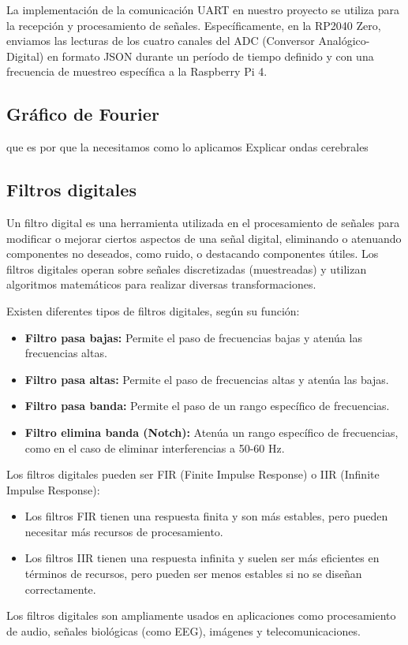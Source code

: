 \documentclass{article}
\begin{document}
La implementación de la comunicación UART en nuestro proyecto se utiliza para la recepción y procesamiento de señales. Específicamente, en la RP2040 Zero, enviamos las lecturas de los cuatro canales del ADC (Conversor Analógico-Digital) en formato JSON durante un período de tiempo definido y con una frecuencia de muestreo específica a la Raspberry Pi 4.

\subsection{Gráfico de Fourier}
que es
por que la necesitamos
como lo aplicamos
Explicar ondas cerebrales

\subsection{Filtros digitales}

Un filtro digital es una herramienta utilizada en el procesamiento de señales para modificar o mejorar ciertos aspectos de una señal digital, eliminando o atenuando componentes no deseados, como ruido, o destacando componentes útiles. Los filtros digitales operan sobre señales discretizadas (muestreadas) y utilizan algoritmos matemáticos para realizar diversas transformaciones.

Existen diferentes tipos de filtros digitales, según su función:
\begin{itemize}
    \item \textbf{Filtro pasa bajas:} Permite el paso de frecuencias bajas y atenúa las frecuencias altas.
    \item \textbf{Filtro pasa altas:} Permite el paso de frecuencias altas y atenúa las bajas.
    \item \textbf{Filtro pasa banda:} Permite el paso de un rango específico de frecuencias.
    \item \textbf{Filtro elimina banda (Notch):} Atenúa un rango específico de frecuencias, como en el caso de eliminar interferencias a 50-60 Hz.
\end{itemize}
Los filtros digitales pueden ser FIR (Finite Impulse Response) o IIR (Infinite Impulse Response):
\begin{itemize}
    \item Los filtros FIR tienen una respuesta finita y son más estables, pero pueden necesitar más recursos de procesamiento.
    \item Los filtros IIR tienen una respuesta infinita y suelen ser más eficientes en términos de recursos, pero pueden ser menos estables si no se diseñan correctamente.
\end{itemize}
Los filtros digitales son ampliamente usados en aplicaciones como procesamiento de audio, señales biológicas (como EEG), imágenes y telecomunicaciones.
\end{document}
